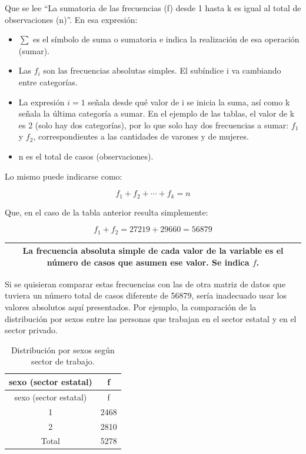 \documentclass[]{book}
\begin{document}
Que se lee ``La sumatoria de las frecuencias (f) desde 1 hasta k es igual al total de observaciones (n)''.
En esa expresión:

\begin{itemize}
\item
  \(\sum\) es el símbolo de suma o sumatoria e indica la realización de esa operación (sumar).
\item
  Las \(f_i\) son las frecuencias absolutas simples. El subíndice i va cambiando entre categorías.
\item
  La expresión \(i=1\) señala desde qué valor de i se inicia la suma, así como k señala la última categoría a sumar. En el ejemplo de las tablas, el valor de k es 2 (solo hay dos categorías), por lo que solo hay dos frecuencias a sumar: \(f_1\) y \(f_2\), correspondientes a las cantidades de varones y de mujeres.
\item
  n es el total de casos (observaciones).
\end{itemize}

Lo mismo puede indicarse como:

\[f_1 + f_2 + ⋯ + f_k = n\]

Que, en el caso de la tabla anterior resulta simplemente:

\[f_1 + f_2 = 27219 + 29660 = 56879\]

\begin{longtable}[]{@{}c@{}}
\toprule
\endhead
\begin{minipage}[t]{0.97\columnwidth}\centering
La \textbf{frecuencia absoluta simple} de cada valor de la variable es el número de casos que asumen ese valor. Se indica \(f\).\strut
\end{minipage}\tabularnewline
\bottomrule
\end{longtable}

Si se quisieran comparar estas frecuencias con las de otra matriz de datos que tuviera un número total de casos diferente de 56879, sería inadecuado usar los valores absolutos aquí presentados. Por ejemplo, la comparación de la distribución por sexos entre las personas que trabajan en el sector estatal y en el sector privado.

\begin{longtable}[]{@{}cc@{}}
\caption{\label{tab:unnamed-chunk-22}Distribución por sexos según sector de trabajo.}\tabularnewline
\toprule
sexo (sector estatal) & f\tabularnewline
\midrule
\endfirsthead
\toprule
sexo (sector estatal) & f\tabularnewline
\midrule
\endhead
1 & 2468\tabularnewline
2 & 2810\tabularnewline
Total & 5278\tabularnewline
\bottomrule
\end{longtable}
\end{document}
